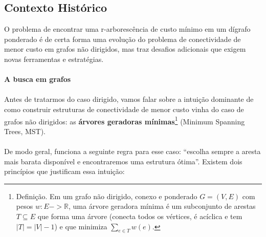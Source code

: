 \documentclass[12pt,a4paper]{article}
\def\emph#1{#1}%
\def\to{->}%
\begin{document}
\subsection{Contexto Histórico}
O problema de encontrar uma r-arborescência de custo mínimo em um dígrafo ponderado é de certa forma uma evolução do problema de conectividade de menor custo em grafos não dirigidos, mas traz desafios adicionais que exigem novas ferramentas e estratégias.

\paragraph{A busca em grafos}

\paragraph{}
Antes de tratarmos do caso \emph{dirigido}, vamos falar sobre a intuição dominante de \emph{como construir estruturas de conectividade de menor custo} vinha do caso de \emph{grafos não dirigidos}: as \textbf{árvores geradoras mínimas}\footnote{Definição. Em um grafo não dirigido, conexo e ponderado \(G=(V,E)\) com pesos \(w:E\to\mathbb{R}\), uma árvore geradora mínima é um subconjunto de arestas \(T\subseteq E\) que forma uma árvore (conecta todos os vértices, é acíclica e tem \(|T|=|V|-1\)) e que minimiza \(\sum_{e\in T} w(e)\).} (\emph{Minimum Spanning Trees}, MST). 

\paragraph{}
De modo geral, funciona a seguinte regra para esse caso: “escolha sempre a aresta mais barata disponível e encontraremos uma estrutura ótima”. Existem dois princípios que justificam essa intuição:
\end{document}

